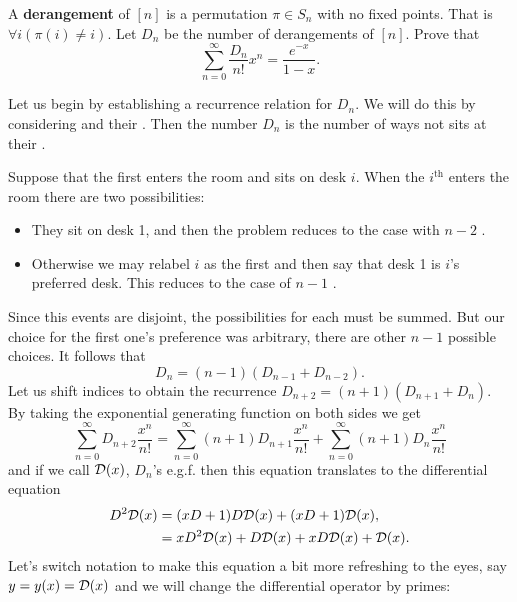 \documentclass[12pt]{memoir}
\begin{document}
   \begin{Ej}[Exercise 8]
         A \textbf{derangement} of $[n]$ is a permutation $\pi\in S_n$ with no fixed points. That is $\forall i(\pi(i)\neq i)$. Let $D_n$ be the number of derangements of $[n]$. Prove that 
         $$\sum_{n=0}^\infty\frac{D_n}{n!}x^n=\frac{e^{-x}}{1-x}.$$  
         \end{Ej}
   \begin{ptcbr}
      Let us begin by establishing a recurrence relation for $D_n$. We will do this by considering  and their . Then the number $D_n$ is the number of ways not  sits at their .\par 
      Suppose that the first  enters the room and sits on desk $i$. When the $i^{\text{th}}$  enters the room there are two possibilities:
      \begin{itemize}
         \itemsep=-0.4em
         \item They sit on desk 1, and then the problem reduces to the case with $n-2$ .
         \item Otherwise we may relabel  $i$ as the first  and then say that desk 1 is $i$'s preferred desk. This reduces to the case of $n-1$ .
      \end{itemize}
      Since this events are disjoint, the possibilities for each must be summed. But our choice for the first one's preference was arbitrary, there are other $n-1$ possible choices. It follows that 
      $$D_n=(n-1)(D_{n-1}+D_{n-2}).$$
      Let us shift indices to obtain the recurrence $D_{n+2}=(n+1)(D_{n+1}+D_n)$. By taking the exponential generating function on both sides we get 
      $$\sum_{n=0}^\infty D_{n+2}\frac{x^n}{n!}=\sum_{n=0}^\infty (n+1)D_{n+1}\frac{x^n}{n!}+\sum_{n=0}^\infty (n+1)D_{n}\frac{x^n}{n!}$$
      and if we call $\mathcal{D}(x)$, $D_n$'s e.g.f. then this equation translates to the differential equation
      \begin{align*}
         D^2\mathcal{D}(x)&=(xD+1)D\mathcal{D}(x)+(xD+1)\mathcal{D}(x),\\
         &=xD^2\mathcal{D}(x)+D\mathcal{D}(x)+xD\mathcal{D}(x)+\mathcal{D}(x).
      \end{align*}  
      Let's switch notation to make this equation a bit more refreshing to the eyes, say $y=y(x)=\mathcal{D}(x)$ and we will change the differential operator by primes:

\end{ptcbr}
\end{document}
